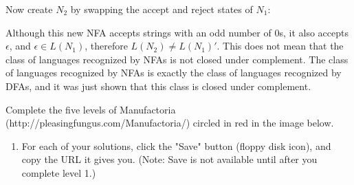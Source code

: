 \documentclass[10pt, legalpaper]{exam}
\begin{document}
\begin{questions}
\begin{enumerate}[(a)]
\begin{center}
    \end{center}
    
    Now create \(N_{2}\) by swapping the accept and reject states of \(N_{1}\):
    \begin{center}       
    \end{center}
    
    Although this new NFA accepts strings with an odd number of 0s, it also accepts \(\epsilon\), and \(\epsilon \in L(N_{1})\), therefore \(L(N_{2}) \neq L(N_{1})'\). This does not mean that the class of languages recognized by NFAs is not closed under complement. The class of languages recognized by NFAs is exactly the class of languages recognized by DFAs, and it was just shown that this class is closed under complement.
\end{enumerate}

\newpage
\addpoints
\question[25] Complete the five levels of Manufactoria (http://pleasingfungus.com/Manufactoria/) circled in red in the image below.
\begin{enumerate}
\item For each of your solutions, click the "Save" button (floppy disk icon), and copy the URL it gives you. (Note: Save is not available until after you complete level 1.)


\end{enumerate}
\end{questions}
\end{document}
